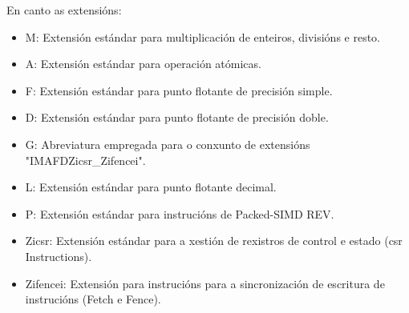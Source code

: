 En canto as extensións: 
\begin{itemize}
    \item M: Extensión estándar para multiplicación de enteiros, divisións e resto.
    \item A: Extensión estándar para operación atómicas.
    \item F: Extensión estándar para punto flotante de precisión simple.
    \item D: Extensión estándar para punto flotante de precisión doble.
    \item G: Abreviatura empregada para o conxunto de extensións "IMAFDZicsr\_Zifencei".
    \item L: Extensión estándar para punto flotante decimal.
    \item P: Extensión estándar para instrucións de Packed-SIMD REV.
    \item Zicsr: Extensión estándar para a xestión de rexistros de control e estado (\acrfull{csr} Instructions).
    \item Zifencei: Extensión para instrucións para a sincronización de escritura de instrucións (Fetch e Fence).
\end{itemize}
